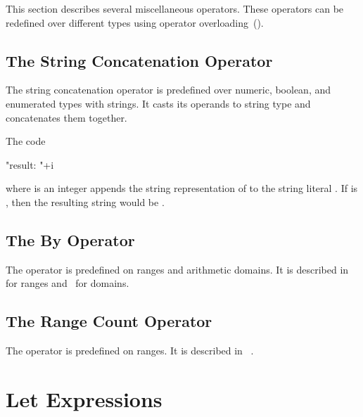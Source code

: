 This section describes several miscellaneous operators.  These
operators can be redefined over different types using operator
overloading~().

\subsection{The String Concatenation Operator}
\label{The_String_Concatenation_Operator}

The string concatenation operator \chpl{+} is predefined over numeric, boolean,
and enumerated types with strings. It casts its operands to string type and
concatenates them together.

\begin{example}
The code
\begin{chapel}
"result: "+i
\end{chapel}
where  is an integer appends the string representation of  to the
string literal .  If  is , then the resulting string
would be .
\end{example}

\subsection{The By Operator}
\label{The_By_Operator}

The operator  is predefined on ranges and arithmetic domains.
It is described in~ for ranges
and~ for domains.

\subsection{The Range Count Operator}
\label{The_Range_Count_Operator}

The operator \chpl{#} is predefined on ranges. It is described
in ~.

\section{Let Expressions}
\label{Let_Expressions}


